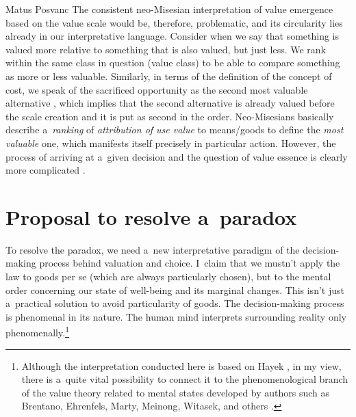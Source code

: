 \begin{artengenv}{Matus Posvanc}
The consistent neo-Misesian interpretation of value emergence based on the value scale would be, therefore, problematic, and its circularity lies already in our interpretative language. Consider when we say that something is valued more relative to something that is also valued, but just less. We rank within the same class in question (value class) to be able to compare something as more or less valuable. Similarly, in terms of the definition of the concept of cost, we speak of the sacrificed opportunity as the second most valuable alternative 
\parencite[or ``the next most urgent want''][p.174]{Mises2003Epistemological}, %
 which implies that the second alternative is already valued before the scale creation and it is put as second in the order. Neo-Misesians basically describe a~\textit{ranking} of \textit{attribution of use value} to means/goods to define the \textit{most valuable} one, which manifests itself precisely in particular action. However, the process of arriving at a~given decision and the question of value essence is clearly more complicated 
\parencites[see also][pp.45–46]{ODriscoll1996Austrian}[][]{Grassl2017Toward}.%




\section{Proposal to resolve a~paradox }



To resolve the paradox, we need a~new interpretative paradigm of the decision-making process behind valuation and choice. I~claim that we mustn't apply the law to goods per se (which are always particularly chosen), but to the mental order concerning our state of well-being and its marginal changes. This isn't just a~practical solution to avoid particularity of goods. The decision-making process is phenomenal in its nature. The human mind interprets surrounding reality only phenomenally.\footnote{Although the interpretation conducted here is based on Hayek 
\parencite*[][]{Hayek1952Sensory}, %
 in my view, there is a~quite vital possibility to connect it to the phenomenological branch of the value theory related to mental states developed by authors such as Brentano, Ehrenfels, Marty, Meinong, Witasek, and others 
\parencites[see][]{Smith1994Austrian}[][]{Grassl2017Toward}.%
}




\end{artengenv}
